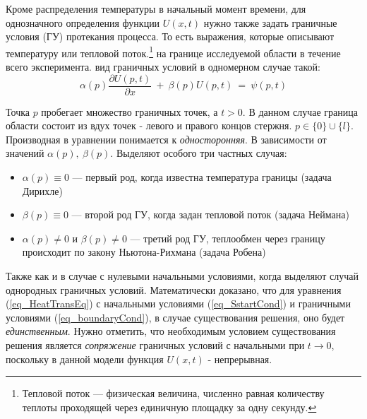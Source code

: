 \documentclass[oneside, final, 14pt]{report}
\begin{document}
Кроме распределения температуры в начальный момент времени, для однозначного определения функции $U(x,t)$ нужно также задать граничные условия (ГУ) протекания процесса. То есть выражения, которые описывают температуру или тепловой поток.\footnote{Тепловой поток --- физическая величина, численно равная количеству теплоты проходящей через единичную площадку за одну секунду.} на границе исследуемой области в течение всего эксперимента. 
 вид граничных условий в одномерном случае такой: 
\begin{equation}
 \alpha(p)\frac{\partial U(p,t)}{\partial x} \ + \ \beta(p)U(p, t) \ = \ \psi(p, t) \label{eq_boundaryCond}
\end{equation}

Точка $p$ пробегает множество граничных точек, а $t > 0$. В данном случае граница области состоит из вдух точек - левого и правого концов стержня. $p \in \{0\}\cup\{l\}$. Производная в уравнении понимается к \emph{односторонняя}. В зависимости от значений $\alpha(p), \ \beta(p)$. Выделяют особого три частных случая: 
\begin{itemize}
 \item $\alpha(p) \equiv 0$ --- первый род, когда известна температура границы (задача Дирихле)
 \item $\beta(p) \equiv 0$ --- второй род ГУ, когда задан тепловой поток (задача Неймана)
 \item $\alpha(p) \neq0$ и $\beta(p) \neq0$ --- третий род ГУ, теплообмен через границу происходит по закону Ньютона-Рихмана (задача Робена)
\end{itemize}


Также как и в случае с нулевыми начальными условиями, когда выделяют случай однородных граничных условий. 
Математически доказано, что для уравнения (\ref{eq_HeatTransEq}) с начальными условиями (\ref{eq_SstartCond}) и граничными условиями (\ref{eq_boundaryCond}), в случае существования решения, оно будет \emph{единственным}. Нужно отметить, что необходимым условием существования решения является \emph{сопряжение} граничных условий с начальными при $t \rightarrow 0$, поскольку в данной модели функция $U(x, t)$ - непрерывная. 
\end{document}

